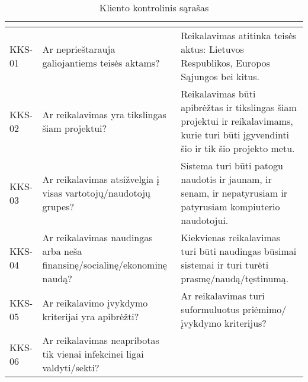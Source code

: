 \documentclass{VUMIFPSkursinis}
\begin{document}
\begin{center}

	\begin{longtable}{|C{2cm}|L{5cm}|L{8cm}|}

		\caption{Kliento kontrolinis sąrašas}
		\label{table:KKS}

		\\ \hline
		                                               &
		                                   &
		\\ \hline
		KKS-01                                                                                        &
		Ar neprieštarauja galiojantiems teisės aktams?                          					  &
		Reikalavimas atitinka teisės aktus: Lietuvos Respublikos, Europos Sąjungos bei kitus.                                     
		\\ \hline
		KKS-02                                                                                        &
		Ar reikalavimas yra tikslingas šiam projektui? 												  &
		Reikalavimas būti apibrėžtas ir tikslingas šiam projektui ir reikalavimams, kurie turi būti įgyvendinti šio ir tik šio projekto metu.                                                                      
		\\ \hline
		KKS-03                                                                                        &
		Ar reikalavimas atsižvelgia į visas vartotojų/naudotojų grupes?                               &
		Sistema turi būti patogu naudotis ir jaunam, ir senam, ir nepatyrusiam ir patyrusiam kompiuterio naudotojui.
		\\ \hline
		KKS-04                                                                                        &
		Ar reikalavimas naudingas arba neša finansinę/socialinę/ekonominę naudą?  									  &
		Kiekvienas reikalavimas turi būti naudingas būsimai sistemai ir turi turėti prasmę/naudą/tęstinumą. 
		\\ \hline 
		KKS-05                                                                                        &
		Ar reikalavimo įvykdymo kriterijai yra apibrėžti?                                             &
		Ar reikalavimas turi suformuluotus priėmimo/įvykdymo kriterijus? 
		\\ \hline
		KKS-06                                                                                        &
		Ar reikalavimas neapribotas tik vienai infekcinei ligai valdyti/sekti?                        &

\end{longtable}
\end{center}
\end{document}
